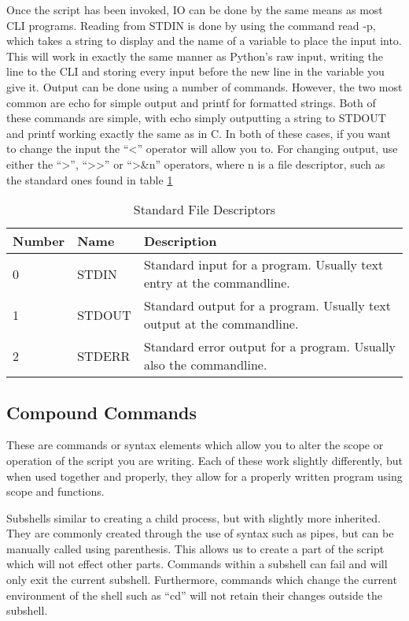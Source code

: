 			Once the script has been invoked, IO can be done by the same means as most CLI programs. 
			Reading from STDIN is done by using the command read -p, which takes a string to display and the name of a variable to place the input into. 
			This will work in exactly the same manner as Python's raw input, writing the line to the CLI and storing every input before the new line in the variable you give it. 
			Output can be done using a number of commands. 
			However, the two most common are echo for simple output and printf for formatted strings. 
			Both of these commands are simple, with echo simply outputting a string to STDOUT and printf working exactly the same as in C. 
			In both of these cases, if you want to change the input the ``<'' operator will allow you to. 
			For changing output, use either the ``>'', ``>{}>'' or ``>\&n'' operators, where n is a file descriptor, such as the standard ones found in table \ref{tab:stdFileDescriptors}
			\begin{table}[htb]
				\centering
				\begin{adjustbox}{max width=1\textwidth}
				\begin{tabular}{|l|l|l|}
					\hline
					\textbf{Number} & \textbf{Name} & \textbf{Description} \\ \hline
					0 & STDIN & Standard input for a program. Usually text entry at the commandline. \\ \hline 
					1 & STDOUT & Standard output for a program. Usually text output at the commandline. \\ \hline
					2 & STDERR & Standard error output for a program. Usually also the commandline. \\ \hline
				\end{tabular}
				\end{adjustbox}
				\caption{Standard File Descriptors}
				\label{tab:stdFileDescriptors}
			\end{table}
					
		\subsection{Compound Commands}
			These are commands or syntax elements which allow you to alter the scope or operation of the script you are writing. 
			Each of these work slightly differently, but when used together and properly, they allow for a properly written program using scope and functions. 

			Subshells similar to creating a child process, but with slightly more inherited. 
			They are commonly created through the use of syntax such as pipes, but can be manually called using parenthesis. 
			This allows us to create a part of the script which will not effect other parts. 
			Commands within a subshell can fail and will only exit the current subshell. 
			Furthermore, commands which change the current environment of the shell such as ``cd'' will not retain their changes outside the subshell. 
			
